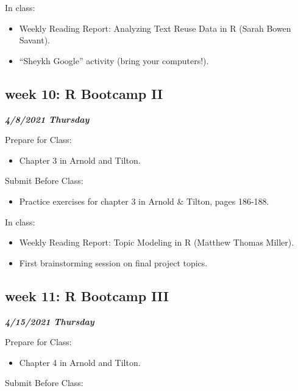 \documentclass[
]{book}
\providecommand{\tightlist}{%
  \setlength{\itemsep}{0pt}\setlength{\parskip}{0pt}}
\begin{document}
In class:

\begin{itemize}
\tightlist
\item
  Weekly Reading Report: Analyzing Text Reuse Data in R (Sarah Bowen Savant).
\item
  ``Sheykh Google'' activity (bring your computers!).
\end{itemize}

\hypertarget{week-10-r-bootcamp-ii}{%
\subsection{week 10: R Bootcamp II}\label{week-10-r-bootcamp-ii}}

\textbf{\emph{4/8/2021 Thursday}}

Prepare for Class:

\begin{itemize}
\tightlist
\item
  Chapter 3 in Arnold and Tilton.
\end{itemize}

Submit Before Class:

\begin{itemize}
\tightlist
\item
  Practice exercises for chapter 3 in Arnold \& Tilton, pages 186-188.
\end{itemize}

In class:

\begin{itemize}
\tightlist
\item
  Weekly Reading Report: Topic Modeling in R (Matthew Thomas Miller).
\item
  First brainstorming session on final project topics.
\end{itemize}

\hypertarget{week-11-r-bootcamp-iii}{%
\subsection{week 11: R Bootcamp III}\label{week-11-r-bootcamp-iii}}

\textbf{\emph{4/15/2021 Thursday}}

Prepare for Class:

\begin{itemize}
\tightlist
\item
  Chapter 4 in Arnold and Tilton.
\end{itemize}

Submit Before Class:
\end{document}
